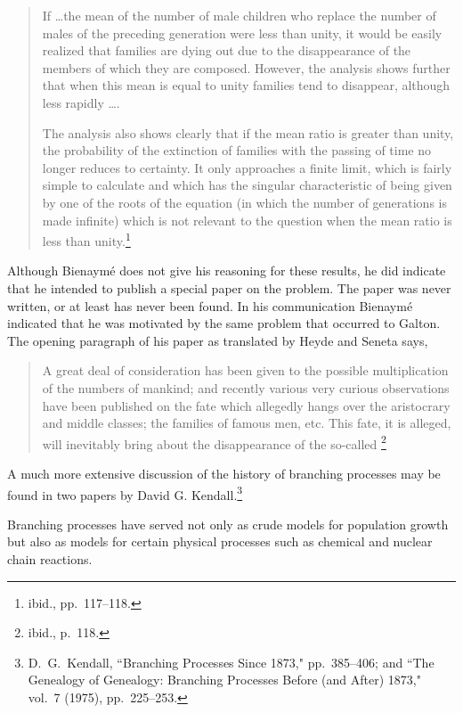 \begin{quote}
If \dots the mean of the number of male children who replace the number of
males of the preceding generation were less than unity, it would be easily
realized that families are dying out due to the disappearance of the members of
which they are composed.  However, the analysis shows further that when this
mean is equal to unity families tend to disappear, although less rapidly \dots.

The analysis also shows clearly that if the mean ratio is greater than unity,
the probability of the extinction of families with the passing of time no
longer reduces to certainty.  It only approaches a finite limit, which is
fairly simple to calculate and which has the singular characteristic of being
given by one of the roots of the equation (in which the number of generations
is made infinite) which is not relevant to the question when the mean ratio is
less than unity.\footnote{ibid., pp.~117--118.}
\end{quote}

Although Bienaym\'e does not give his reasoning for these results, he did
indicate that he intended to publish a special paper on the problem.  The paper
was never written, or at least has never been found.  In his communication
Bienaym\'e indicated that he was motivated by the same problem that occurred to
Galton.  The opening paragraph of his paper as translated by Heyde and Seneta
says,

\begin{quote}
A great deal of consideration has been given to the possible multiplication of
the numbers of mankind; and recently various very curious observations have
been published on the fate which allegedly hangs over the aristocrary and
middle classes; the families of famous men, etc.  This fate, it is alleged,
will inevitably bring about the disappearance of the so-called \footnote{ibid., p.~118.}
\end{quote}


A much more extensive discussion of the history of branching processes may be
found in two papers by David G. Kendall.\footnote{D.~G.~Kendall, 
``Branching Processes Since 1873," pp.~385--406; and ``The Genealogy of Genealogy:
Branching Processes Before (and After) 1873,"  vol.~7 (1975), pp.~225--253.} 

Branching processes have served not only as crude models for population growth
but also as models for certain physical processes such as chemical and nuclear
chain reactions.

